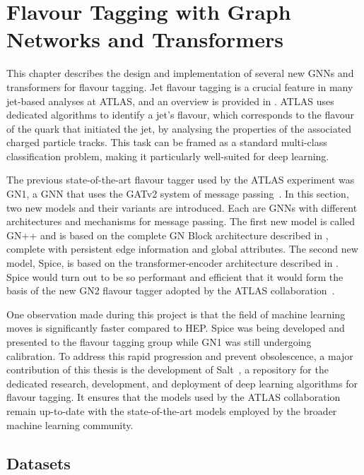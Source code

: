 
\chapter{Flavour Tagging with Graph Networks and Transformers}
\label{ch:spice}

This chapter describes the design and implementation of several new GNNs and transformers for flavour tagging.
Jet flavour tagging is a crucial feature in many jet-based analyses at ATLAS, and an overview is provided in .
ATLAS uses dedicated algorithms to identify a jet's flavour, which corresponds to the flavour of the quark that initiated the jet, by analysing the properties of the associated charged particle tracks.
This task can be framed as a standard multi-class classification problem, making it particularly well-suited for deep learning.

The previous state-of-the-art flavour tagger used by the ATLAS experiment was GN1, a GNN that uses the GATv2 system of message passing~\cite{GATv2}.
In this section, two new models and their variants are introduced.
Each are GNNs with different architectures and mechanisms for message passing.
The first new model is called GN++ and is based on the complete GN Block architecture described in , complete with persistent edge information and global attributes.
The second new model, Spice, is based on the transformer-encoder architecture described in .
Spice would turn out to be so performant and efficient that it would form the basis of the new GN2 flavour tagger adopted by the ATLAS collaboration~\cite{GN2Plots}.

One observation made during this project is that the field of machine learning moves is significantly faster compared to HEP.
Spice was being developed and presented to the flavour tagging group while GN1 was still undergoing calibration.
To address this rapid progression and prevent obsolescence, a major contribution of this thesis is the development of Salt~\cite{Salt}, a repository for the dedicated research, development, and deployment of deep learning algorithms for flavour tagging.
It ensures that the models used by the ATLAS collaboration remain up-to-date with the state-of-the-art models employed by the broader machine learning community.

\section{Datasets}

